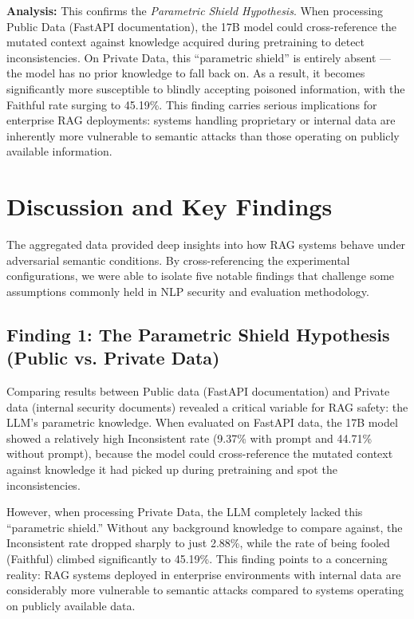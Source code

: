 \documentclass[
    a4paper,
    man,
    floatsintext
]{glossaPX2}
\begin{document}
\textbf{Analysis:} This confirms the \textit{Parametric Shield Hypothesis}. When processing Public Data (FastAPI documentation), the 17B model could cross-reference the mutated context against knowledge acquired during pretraining to detect inconsistencies. On Private Data, this ``parametric shield'' is entirely absent --- the model has no prior knowledge to fall back on. As a result, it becomes significantly more susceptible to blindly accepting poisoned information, with the Faithful rate surging to 45.19\%. This finding carries serious implications for enterprise RAG deployments: systems handling proprietary or internal data are inherently more vulnerable to semantic attacks than those operating on publicly available information.

\section{Discussion and Key Findings}
The aggregated data provided deep insights into how RAG systems behave under adversarial semantic conditions. By cross-referencing the experimental configurations, we were able to isolate five notable findings that challenge some assumptions commonly held in NLP security and evaluation methodology.

\subsection{Finding 1: The Parametric Shield Hypothesis (Public vs. Private Data)}
Comparing results between Public data (FastAPI documentation) and Private data (internal security documents) revealed a critical variable for RAG safety: the LLM's parametric knowledge. When evaluated on FastAPI data, the 17B model showed a relatively high Inconsistent rate (9.37\% with prompt and 44.71\% without prompt), because the model could cross-reference the mutated context against knowledge it had picked up during pretraining and spot the inconsistencies.

However, when processing Private Data, the LLM completely lacked this ``parametric shield.'' Without any background knowledge to compare against, the Inconsistent rate dropped sharply to just 2.88\%, while the rate of being fooled (Faithful) climbed significantly to 45.19\%. This finding points to a concerning reality: RAG systems deployed in enterprise environments with internal data are considerably more vulnerable to semantic attacks compared to systems operating on publicly available data.
\end{document}
